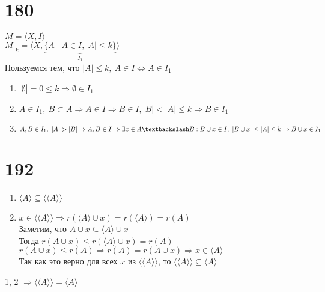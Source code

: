 \documentclass{article}
\begin{document}
\section*{180}
\label{sec:orge1b25b9}
\(M = \langle X, I \rangle\) \\
\(M|_k = \langle X, \underbrace{\{A \mid A \in I, |A| \le k\}}_{I_1} \rangle\) \\
Пользуемся тем, что \(|A| \le k,\ A \in I \Leftrightarrow A \in I_1\)
\begin{enumerate}
\item \(|\emptyset| = 0 \le k \Rightarrow \emptyset \in I_1\)
\item \(A \in I_1,\ B \subset A \Rightarrow A \in I \Rightarrow B \in I, |B| < |A| \le k \Rightarrow B \in I_1\)
\item \(A, B \in I_1,\ |A| > |B| \Rightarrow A, B \in I \Rightarrow \exists x \in A \textbackslash B : B\cup x \in I,\ |B\cup x| \le |A| \le k \Rightarrow B\cup x \in I_1\)
\end{enumerate}
\section*{192}
\label{sec:org116ba12}
\begin{enumerate}
\item \(\langle A \rangle \subseteq \langle \langle A \rangle \rangle\)
\item \(x \in \langle \langle A \rangle \rangle \Rightarrow r(\langle A \rangle \cup x) = r(\langle A \rangle) = r(A)\) \\
Заметим, что \(A\cup x \subseteq \langle A \rangle \cup x\) \\
Тогда \(r(A \cup x ) \le r(\langle A \rangle \cup x) = r(A)\) \\
\(r(A \cup x) \le r(A) \Rightarrow r(A) = r(A \cup x) \Rightarrow x \in \langle A \rangle\) \\
Так как это верно для всех \(x\) из \(\langle \langle A \rangle \rangle\), то \(\langle \langle A \rangle \rangle \subseteq \langle A \rangle\)
\end{enumerate}
1, 2 \(\Rightarrow \langle \langle A \rangle \rangle = \langle A \rangle\)
\end{document}
